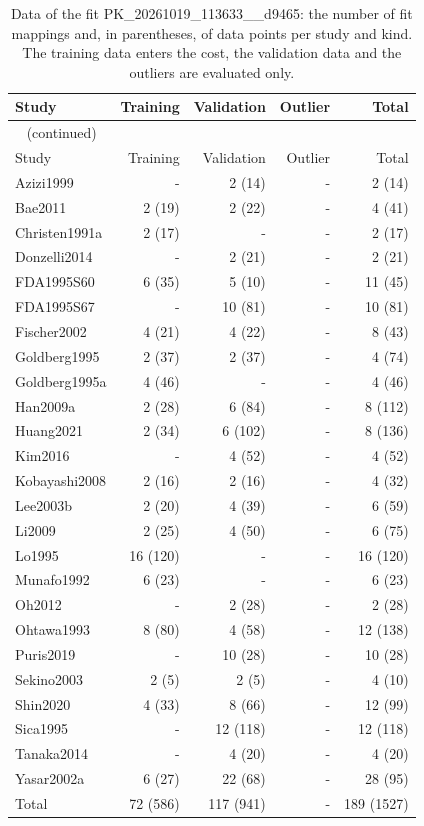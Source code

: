 \begin{longtable}{lrrrr}
\caption{Data of the fit PK\_20261019\_113633\_\_d9465: the number of fit mappings and, in parentheses, of data points per study and kind. The training data enters the cost, the validation data and the outliers are evaluated only.}\label{tab:data:PK_20261019_113633__d9465} \\
\toprule
Study & Training & Validation & Outlier & Total \\
\midrule
\endfirsthead
\multicolumn{5}{l}{\small\tablename~\thetable{} (continued)} \\
\toprule
Study & Training & Validation & Outlier & Total \\
\midrule
\endhead
\bottomrule
\endlastfoot
Azizi1999 & - & 2 (14) & - & 2 (14) \\
Bae2011 & 2 (19) & 2 (22) & - & 4 (41) \\
Christen1991a & 2 (17) & - & - & 2 (17) \\
Donzelli2014 & - & 2 (21) & - & 2 (21) \\
FDA1995S60 & 6 (35) & 5 (10) & - & 11 (45) \\
FDA1995S67 & - & 10 (81) & - & 10 (81) \\
Fischer2002 & 4 (21) & 4 (22) & - & 8 (43) \\
Goldberg1995 & 2 (37) & 2 (37) & - & 4 (74) \\
Goldberg1995a & 4 (46) & - & - & 4 (46) \\
Han2009a & 2 (28) & 6 (84) & - & 8 (112) \\
Huang2021 & 2 (34) & 6 (102) & - & 8 (136) \\
Kim2016 & - & 4 (52) & - & 4 (52) \\
Kobayashi2008 & 2 (16) & 2 (16) & - & 4 (32) \\
Lee2003b & 2 (20) & 4 (39) & - & 6 (59) \\
Li2009 & 2 (25) & 4 (50) & - & 6 (75) \\
Lo1995 & 16 (120) & - & - & 16 (120) \\
Munafo1992 & 6 (23) & - & - & 6 (23) \\
Oh2012 & - & 2 (28) & - & 2 (28) \\
Ohtawa1993 & 8 (80) & 4 (58) & - & 12 (138) \\
Puris2019 & - & 10 (28) & - & 10 (28) \\
Sekino2003 & 2 (5) & 2 (5) & - & 4 (10) \\
Shin2020 & 4 (33) & 8 (66) & - & 12 (99) \\
Sica1995 & - & 12 (118) & - & 12 (118) \\
Tanaka2014 & - & 4 (20) & - & 4 (20) \\
Yasar2002a & 6 (27) & 22 (68) & - & 28 (95) \\
Total & 72 (586) & 117 (941) & - & 189 (1527) \\
\end{longtable}

